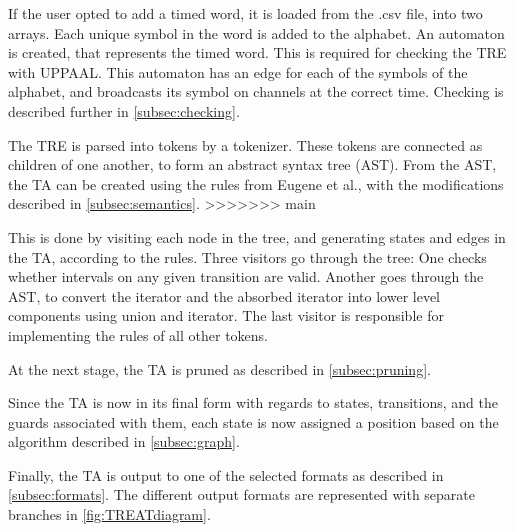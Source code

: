 If the user opted to add a timed word, it is loaded from the .csv file, into two arrays. Each unique symbol in the word is added to the alphabet.
An automaton is created, that represents the timed word. This is required for checking the TRE with UPPAAL. This automaton has an edge for each of the symbols of the alphabet, and broadcasts its symbol on channels at the correct time. Checking is described further in \cref{subsec:checking}.

The TRE is parsed into tokens by a tokenizer. These tokens are connected as children of one another, to form an abstract syntax tree (AST). 
From the AST, the TA can be created using the rules from Eugene et al., with the modifications described in \cref{subsec:semantics}.
>>>>>>> main

This is done by visiting each node in the tree, and generating states and edges in the TA, according to the rules. Three visitors go through the tree: One checks whether intervals on any given transition are valid. Another goes through the AST, to convert the iterator and the absorbed iterator into lower level components using union and iterator. The last visitor is responsible for implementing the rules of all other tokens.

At the next stage, the TA is pruned as described in \cref{subsec:pruning}. 

Since the TA is now in its final form with regards to states, transitions, and the guards associated with them, each state is now assigned a position based on the algorithm described in \cref{subsec:graph}.

Finally, the TA is output to one of the selected formats as described in \cref{subsec:formats}. The different output formats are represented with separate branches in \cref*{fig:TREATdiagram}.







